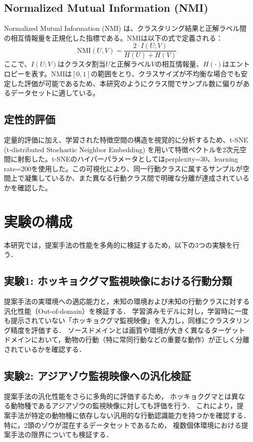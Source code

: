 \subsection{Normalized Mutual Information (NMI)}
Normalized Mutual Information (NMI) は、クラスタリング結果と正解ラベル間の相互情報量を正規化した指標である。NMIは以下の式で定義される：
\begin{equation}
  \mathrm{NMI}(U, V) = \frac{2 \cdot I(U; V)}{H(U) + H(V)}
\end{equation}
ここで、$I(U; V)$はクラスタ割当$U$と正解ラベル$V$の相互情報量、$H(\cdot)$はエントロピーを表す。NMIは$[0, 1]$の範囲をとり、クラスサイズが不均衡な場合でも安定した評価が可能であるため、本研究のようにクラス間でサンプル数に偏りがあるデータセットに適している。

\subsection{定性的評価}
定量的評価に加え、学習された特徴空間の構造を視覚的に分析するため、t-SNE (t-distributed Stochastic Neighbor Embedding) \cite{van2008visualizing} を用いて特徴ベクトルを2次元空間に射影した。t-SNEのハイパーパラメータとしてはperplexity=30、learning rate=200を使用した。この可視化により、同一行動クラスに属するサンプルが空間上で凝集しているか、また異なる行動クラス間で明確な分離が達成されているかを確認した。


\section{実験の構成}
本研究では，提案手法の性能を多角的に検証するため，以下の3つの実験を行う．

\subsection{実験1: ホッキョクグマ監視映像における行動分類}
提案手法の実環境への適応能力と，未知の環境および未知の行動クラスに対する汎化性能（Out-of-domain）を検証する．
学習済みモデルに対し，学習時に一度も提示されていない「ホッキョクグマ監視映像」を入力し，同様にクラスタリング精度を評価する．
ソースドメインとは画質や環境が大きく異なるターゲットドメインにおいて，動物の行動（特に常同行動などの重要な動作）が正しく分離されているかを確認する．

\subsection{実験2: アジアゾウ監視映像への汎化検証}
提案手法の汎化性能をさらに多角的に評価するため，
ホッキョクグマとは異なる動物種であるアジアゾウの監視映像に対しても評価を行う．
これにより，提案手法が特定の動物種に依存しない汎用的な行動認識能力を持つかを確認する．
特に，2頭のゾウが混在するデータセットであるため，
複数個体環境における提案手法の限界についても検証する．

